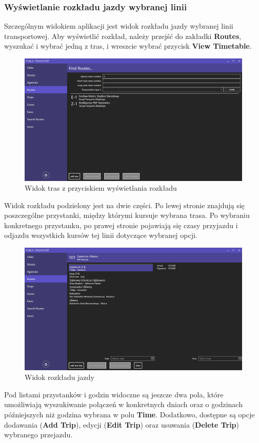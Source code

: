 \documentclass[10pt,a4paper]{article}
\begin{document}
\subsubsection{Wyświetlanie rozkładu jazdy wybranej linii}
Szczególnym widokiem aplikacji jest widok rozkładu jazdy wybranej linii transportowej. Aby wyświetlić rozkład, należy przejść do zakładki \textbf{Routes}, wyszukać i wybrać jedną z tras, i wreszcie wybrać przycisk \textbf{View Timetable}.
\begin{figure}[H]
	\centering
	\includegraphics[width=15cm]{Resources/Images/09_filter_route.png}
	\caption{Widok tras z przyciskiem wyświetlania rozkładu}
\end{figure}
Widok rozkładu podzielony jest na dwie części. Po lewej stronie znajdują się poszczególne przystanki, między którymi kursuje wybrana trasa. Po wybraniu konkretnego przystanku, po prawej stronie pojawiają się czasy przyjazdu i odjazdu wszystkich kursów tej linii dotyczące wybranej opcji.
\begin{figure}[H]
	\centering
	\includegraphics[width=15cm]{Resources/Images/10_timetable.png}
	\caption{Widok rozkładu jazdy}
\end{figure}
Pod listami przystanków i godzin widoczne są jeszcze dwa pola, które umożliwiają wyszukiwanie połączeń w konkretnych dniach oraz o godzinach późniejszych niż godzina wybrana w polu \textbf{Time}. Dodatkowo, dostępne są opcje dodawania (\textbf{Add Trip}), edycji (\textbf{Edit Trip}) oraz usuwania (\textbf{Delete Trip}) wybranego przejazdu.
\end{document}
